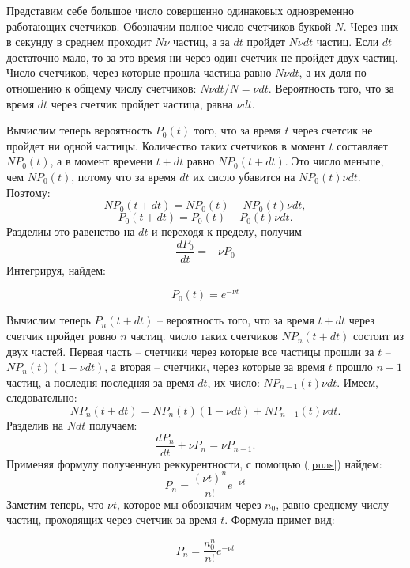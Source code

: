 \documentclass[a4paper, 12pt]{article}
\begin{document}
	Представим себе большое число совершенно одинаковых одновременно
	работающих счетчиков. Обозначим полное число счетчиков буквой $N$.
	Через них в секунду в среднем проходит $N\nu$ частиц, а за
	$dt$ пройдет $N\nu dt$ частиц. Если $dt$ достаточно мало, то за это время
	ни через один счетчик не пройдет двух частиц. Число счетчиков, через
	которые прошла частица равно $N\nu dt$, а их доля по отношению к общему числу
	счетчиков: $N\nu dt/N = \nu dt$. Вероятность того, что за время $dt$ через
	счетчик пройдет частица, равна $\nu dt$.

	Вычислим теперь вероятность $P_0(t)$ того, что за время $t$ через счетсик не пройдет ни одной частицы. Количество таких счетчиков в момент $t$ составляет $NP_0 (t)$, а в момент времени $t+dt$ равно $NP_0 (t+dt)$. Это число меньше, чем $NP_0 (t)$, потому что за время $dt$ их сисло убавится на $NP_0 (t)\nu dt$. Поэтому: \[NP_0 (t+dt) = NP_0(t) - NP_0 (t)\nu dt,\] \[P_0 (t+dt) = P_0(t) - P_0 (t)\nu dt.\] Разделиы это равенство на $dt$ и переходя к пределу, получим \[ \frac{dP_0}{dt} = -\nu P_0 \]  Интегрируя, найдем:

	\begin{equation}
		P_0 (t) = e^{-\nu t}
		\label{puas}
	\end{equation}

	Вычислим теперь $P_n (t+dt)$ -- вероятность того, что за время $t+dt$ через счетчик пройдет ровно $n$ частиц. число таких счетчиков $NP_n(t+dt)$ состоит из двух частей. Первая часть -- счетчики через которые все частицы прошли за $t$ -- $NP_n(t)(1-\nu dt)$, а вторая -- счетчики, через которые за время $t$ прошло $n-1$ частиц, а последня последняя за время $dt$, их число: $NP_{n-1}(t)\nu dt$. Имеем, следовательно: \[NP_n(t+dt) = NP_n(t)(1-\nu dt) + NP_{n-1}(t)\nu dt.\]
	Разделив на $Ndt$ получаем:\[ \frac{dP_n}{dt} + \nu P_n = \nu P_{n-1}. \]
	Применяя формулу полученную реккурентности, с помощью (\ref{puas}) найдем: \[ P_n = \frac{(\nu t)^n}{n!}e^{-\nu t} \]
	Заметим теперь, что $\nu t $, которое мы обозначим через $n_0$, равно среднему числу частиц, проходящих через счетчик за время $t$. Формула примет вид:

	\begin{equation}
		P_n = \frac{n_0^n}{n!}e^{-\nu t}
	\end{equation}
\end{document}
